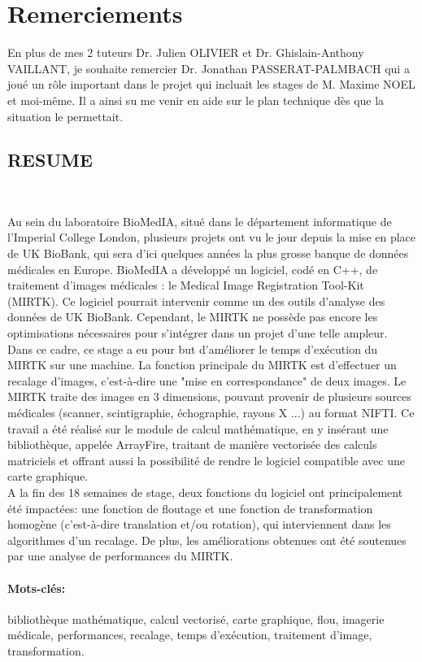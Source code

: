 \documentclass[10pt]{report}
\begin{document}
\section*{Remerciements}
En plus de mes 2 tuteurs Dr. Julien OLIVIER et Dr. Ghislain-Anthony VAILLANT, je souhaite remercier Dr. Jonathan PASSERAT-PALMBACH qui a joué un rôle important dans le projet qui incluait les stages de M. Maxime NOEL et moi-même. Il a ainsi su me venir en aide sur le plan technique dès que la situation le permettait.
\newpage
\subsection*{RESUME} 
~\par 
Au sein du laboratoire BioMedIA, situé dans le département informatique de l'Imperial College London, plusieurs projets ont vu le jour depuis la mise en place de UK BioBank, qui sera d'ici quelques années la plus grosse banque de données médicales en Europe. BioMedIA a développé un logiciel, codé en C++, de traitement d'images médicales : le Medical Image Registration Tool-Kit (MIRTK). Ce logiciel pourrait intervenir comme un des outils d'analyse des données de UK BioBank. Cependant, le MIRTK ne possède pas encore les optimisations nécessaires pour s'intégrer dans un projet d'une telle ampleur.\\
Dans ce cadre, ce stage a eu pour but d'améliorer le temps d'exécution du MIRTK sur une machine. La fonction principale du MIRTK est d'effectuer un recalage d'images, c'est-à-dire une "mise en correspondance" de deux images. Le MIRTK traite des images en 3 dimensions, pouvant provenir de plusieurs sources médicales (scanner, scintigraphie, échographie, rayons X ...) au format NIFTI. Ce travail a été réalisé sur le module de calcul mathématique, en y insérant une bibliothèque, appelée ArrayFire, traitant de manière vectorisée des calculs matriciels et offrant aussi la possibilité de rendre le logiciel compatible avec une carte graphique. \\
A la fin des 18 semaines de stage, deux fonctions du logiciel ont principalement été impactées: une fonction de floutage et une fonction de transformation homogène (c'est-à-dire translation et/ou rotation), qui interviennent dans les algorithmes d'un recalage. De plus, les améliorations obtenues ont été soutenues par une analyse de performances du MIRTK.
~\par 
\paragraph*{Mots-clés:}
bibliothèque mathématique, calcul vectorisé, carte graphique, flou, imagerie médicale, performances, recalage, temps d'exécution, traitement d'image, transformation.
~\par \vspace{0.5cm}
\end{document}
